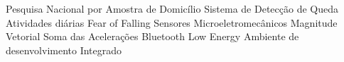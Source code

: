 \begin{acronym}[ACRONYM] 

 { Pesquisa Nacional por Amostra de Domicílio }
 {Sistema de Detecção de Queda}
 {Atividades diárias}
 {Fear of Falling}
 { Sensores Microeletromecânicos }
 { Magnitude Vetorial }
 {Soma das Acelerações}
 {Bluetooth Low Energy}
 {Ambiente de desenvolvimento Integrado}
    
\end{acronym}